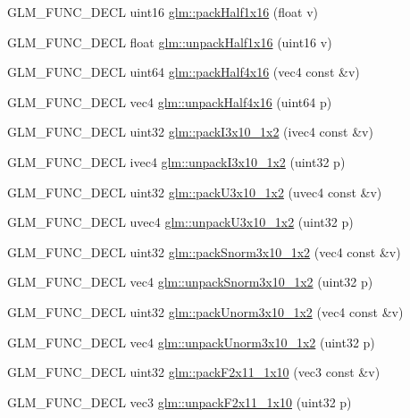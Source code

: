 \begin{DoxyCompactItemize}
\item 
G\+L\+M\+\_\+\+F\+U\+N\+C\+\_\+\+D\+E\+CL uint16 \hyperlink{group__gtc__packing_gaba534b320836a35372e00af5771dd1a2}{glm\+::pack\+Half1x16} (float v)
\item 
G\+L\+M\+\_\+\+F\+U\+N\+C\+\_\+\+D\+E\+CL float \hyperlink{group__gtc__packing_gaa6eebcdfc746584b7d1823f1d5344fed}{glm\+::unpack\+Half1x16} (uint16 v)
\item 
G\+L\+M\+\_\+\+F\+U\+N\+C\+\_\+\+D\+E\+CL uint64 \hyperlink{group__gtc__packing_ga8104f0b719b7792491f2b789a6dd6f96}{glm\+::pack\+Half4x16} (vec4 const \&v)
\item 
G\+L\+M\+\_\+\+F\+U\+N\+C\+\_\+\+D\+E\+CL vec4 \hyperlink{group__gtc__packing_gaea526d6491ad40401eac34803984bf27}{glm\+::unpack\+Half4x16} (uint64 p)
\item 
G\+L\+M\+\_\+\+F\+U\+N\+C\+\_\+\+D\+E\+CL uint32 \hyperlink{group__gtc__packing_ga032e18fa5bc5b8f3897104aeb2f1e195}{glm\+::pack\+I3x10\+\_\+1x2} (ivec4 const \&v)
\item 
G\+L\+M\+\_\+\+F\+U\+N\+C\+\_\+\+D\+E\+CL ivec4 \hyperlink{group__gtc__packing_ga08bcd34cf9c34701d658dd861ee6e300}{glm\+::unpack\+I3x10\+\_\+1x2} (uint32 p)
\item 
G\+L\+M\+\_\+\+F\+U\+N\+C\+\_\+\+D\+E\+CL uint32 \hyperlink{group__gtc__packing_gaf656d8862628f96b20de7a36eaa1fe56}{glm\+::pack\+U3x10\+\_\+1x2} (uvec4 const \&v)
\item 
G\+L\+M\+\_\+\+F\+U\+N\+C\+\_\+\+D\+E\+CL uvec4 \hyperlink{group__gtc__packing_ga119aa2d7d55952f9dc4214390a6ffefc}{glm\+::unpack\+U3x10\+\_\+1x2} (uint32 p)
\item 
G\+L\+M\+\_\+\+F\+U\+N\+C\+\_\+\+D\+E\+CL uint32 \hyperlink{group__gtc__packing_ga0d4157cec37c0312216a7be1cc92df54}{glm\+::pack\+Snorm3x10\+\_\+1x2} (vec4 const \&v)
\item 
G\+L\+M\+\_\+\+F\+U\+N\+C\+\_\+\+D\+E\+CL vec4 \hyperlink{group__gtc__packing_ga8b8bb827a3743ca553d8702d3e337101}{glm\+::unpack\+Snorm3x10\+\_\+1x2} (uint32 p)
\item 
G\+L\+M\+\_\+\+F\+U\+N\+C\+\_\+\+D\+E\+CL uint32 \hyperlink{group__gtc__packing_ga2cf2d11b40bd48639110456fd74c2e33}{glm\+::pack\+Unorm3x10\+\_\+1x2} (vec4 const \&v)
\item 
G\+L\+M\+\_\+\+F\+U\+N\+C\+\_\+\+D\+E\+CL vec4 \hyperlink{group__gtc__packing_gaf69ace2b5e9234f8afb4e99c3df1193d}{glm\+::unpack\+Unorm3x10\+\_\+1x2} (uint32 p)
\item 
G\+L\+M\+\_\+\+F\+U\+N\+C\+\_\+\+D\+E\+CL uint32 \hyperlink{group__gtc__packing_ga8c2a0eeee677ca4dafd9e093d9e81062}{glm\+::pack\+F2x11\+\_\+1x10} (vec3 const \&v)
\item 
G\+L\+M\+\_\+\+F\+U\+N\+C\+\_\+\+D\+E\+CL vec3 \hyperlink{group__gtc__packing_ga8b9c7991eb021d95c778bf5c0b2f7824}{glm\+::unpack\+F2x11\+\_\+1x10} (uint32 p)
\end{DoxyCompactItemize}


